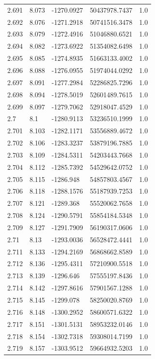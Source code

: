 \begin{tabular}{lllll}
2.691 & 8.073 & -1270.0927 & 50437978.7437 & 1.0 \\
2.692 & 8.076 & -1271.2918 & 50741516.3478 & 1.0 \\
2.693 & 8.079 & -1272.4916 & 51046880.6521 & 1.0 \\
2.694 & 8.082 & -1273.6922 & 51354082.6498 & 1.0 \\
2.695 & 8.085 & -1274.8935 & 51663133.4002 & 1.0 \\
2.696 & 8.088 & -1276.0955 & 51974044.0292 & 1.0 \\
2.697 & 8.091 & -1277.2984 & 52286825.7296 & 1.0 \\
2.698 & 8.094 & -1278.5019 & 52601489.7615 & 1.0 \\
2.699 & 8.097 & -1279.7062 & 52918047.4529 & 1.0 \\
2.7 & 8.1 & -1280.9113 & 53236510.1999 & 1.0 \\
2.701 & 8.103 & -1282.1171 & 53556889.4672 & 1.0 \\
2.702 & 8.106 & -1283.3237 & 53879196.7885 & 1.0 \\
2.703 & 8.109 & -1284.5311 & 54203443.7668 & 1.0 \\
2.704 & 8.112 & -1285.7392 & 54529642.0752 & 1.0 \\
2.705 & 8.115 & -1286.948 & 54857803.4567 & 1.0 \\
2.706 & 8.118 & -1288.1576 & 55187939.7253 & 1.0 \\
2.707 & 8.121 & -1289.368 & 55520062.7658 & 1.0 \\
2.708 & 8.124 & -1290.5791 & 55854184.5348 & 1.0 \\
2.709 & 8.127 & -1291.7909 & 56190317.0606 & 1.0 \\
2.71 & 8.13 & -1293.0036 & 56528472.4441 & 1.0 \\
2.711 & 8.133 & -1294.2169 & 56868662.8589 & 1.0 \\
2.712 & 8.136 & -1295.4311 & 57210900.5518 & 1.0 \\
2.713 & 8.139 & -1296.646 & 57555197.8436 & 1.0 \\
2.714 & 8.142 & -1297.8616 & 57901567.1288 & 1.0 \\
2.715 & 8.145 & -1299.078 & 58250020.8769 & 1.0 \\
2.716 & 8.148 & -1300.2952 & 58600571.6322 & 1.0 \\
2.717 & 8.151 & -1301.5131 & 58953232.0146 & 1.0 \\
2.718 & 8.154 & -1302.7318 & 59308014.7199 & 1.0 \\
2.719 & 8.157 & -1303.9512 & 59664932.5203 & 1.0 \\

\end{tabular}
